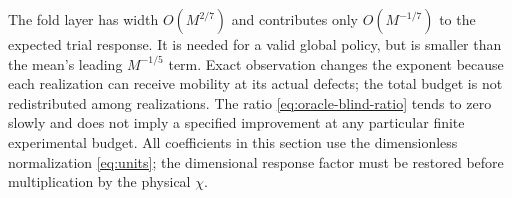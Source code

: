 The fold layer has width $O(M^{2/7})$ and contributes only
$O(M^{-1/7})$ to the expected trial response. It is needed for a
valid global policy, but is smaller than the mean's leading
$M^{-1/5}$ term. Exact observation changes the exponent because each
realization can receive mobility at its actual defects; the total
budget is not redistributed among realizations. The ratio
\eqref{eq:oracle-blind-ratio} tends to zero slowly and does not imply
a specified improvement at any particular finite experimental budget.
All coefficients in this section use the dimensionless normalization
\eqref{eq:units}; the dimensional response factor must be restored
before multiplication by the physical $\chi$.
